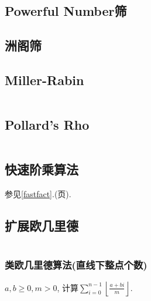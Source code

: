 \documentclass[a4paper, twoside]{article}
\begin{document}
\begin{multicols}{2}
			\subsection{Powerful Number筛}
				

			\subsection{洲阁筛}
				



			\subsection{Miller-Rabin}
				\inputminted{cpp}{../src/numbertheory/Miller-Rabin.cpp}

			\subsection{Pollard's Rho}
				\inputminted{cpp}{../src/numbertheory/Pollard-Rho.cpp}
			
			\subsection{快速阶乘算法}
				参见\ref{fastfact}.(\pageref{fastfact}页).



			\subsection{扩展欧几里德}
				\inputminted{cpp}{../src/numbertheory/exgcd.cpp}
				

				\subsubsection{类欧几里德算法(直线下整点个数)}
					$a,b \ge 0, m > 0$, 计算$\sum_{i = 0} ^ {n - 1} \left\lfloor \frac {a + bi} m \right\rfloor$.
					\inputminted{cpp}{../src/numbertheory/类欧.cpp}
			

\end{multicols}
\end{document}
